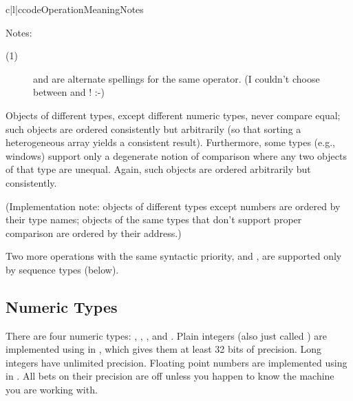 \begin{tableiii}{c|l|c}{code}{Operation}{Meaning}{Notes}
\end{tableiii}
\opindex{==} %

\noindent
Notes:

\begin{description}

\item[(1)]
\code{<>} and \code{!=} are alternate spellings for the same operator.
(I couldn't choose between \ABC{} and \C{}! :-)

\end{description}

Objects of different types, except different numeric types, never
compare equal; such objects are ordered consistently but arbitrarily
(so that sorting a heterogeneous array yields a consistent result).
Furthermore, some types (e.g., windows) support only a degenerate
notion of comparison where any two objects of that type are unequal.
Again, such objects are ordered arbitrarily but consistently.

(Implementation note: objects of different types except numbers are
ordered by their type names; objects of the same types that don't
support proper comparison are ordered by their address.)

Two more operations with the same syntactic priority,  and
, are supported only by sequence types (below).


\subsection{Numeric Types \label{typesnumeric}}

There are four numeric types: , , 
, and .
Plain integers (also just called )
are implemented using  in \C{}, which gives them at least 32
bits of precision.  Long integers have unlimited precision.  Floating
point numbers are implemented using  in \C{}.  All bets on
their precision are off unless you happen to know the machine you are
working with.

